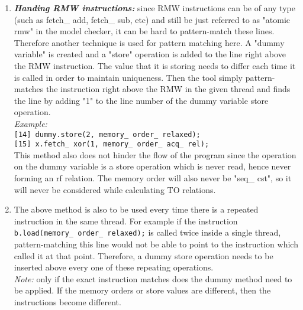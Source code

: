 \begin{enumerate}
	\item \textbf{\textit{Handing RMW instructions:}} since RMW instructions can be of any type (such as fetch\_ add, fetch\_ sub, etc) and still be just referred to as "atomic rmw" in the model checker, it can be hard to pattern-match these lines. Therefore another technique is used for pattern matching here. A "dummy variable" is created and a "store" operation is added to the line right above the RMW instruction. The value that it is storing needs to differ each time it is called in order to maintain uniqueness. Then the tool simply pattern-matches the instruction right above the RMW in the given thread and finds the line by adding "1" to the line number of the dummy variable store operation.\\
	\textit{Example:}\\ \texttt{[14] dummy.store(2, memory\_ order\_ relaxed);}\\ \texttt{[15] x.fetch\_ xor(1, memory\_ order\_ acq\_ rel);}\\
	This method also does not hinder the flow of the program since the operation on the dummy variable is a store operation which is never read, hence never forming an rf relation. The memory order will also never be "seq\_ cst", so it will never be considered while calculating TO relations.
	
	\item The above method is also to be used every time there is a repeated instruction in the same thread. For example if the instruction \texttt{b.load(memory\_ order\_ relaxed);} is called twice inside a single thread, pattern-matching this line would not be able to point to the instruction which called it at that point. Therefore, a dummy store operation needs to be inserted above every one of these repeating operations.\\\textit{Note:} only if the exact instruction matches does the dummy method need to be applied. If the memory orders or store values are different, then the instructions become different.
	

\end{enumerate}
